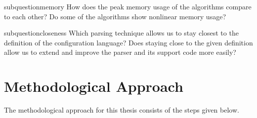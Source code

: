 \begin{restatable}{subquestion}{memory}
  \label{que:memory}
  How does the peak memory usage of the algorithms compare to each other? Do some of the algorithms show nonlinear memory usage?
\end{restatable}

\begin{restatable}{subquestion}{closeness}
  \label{que:closeness}
  Which parsing technique allows us to stay closest to the definition of the configuration language? Does staying close to the given definition
  allow us to extend and improve the parser and its support code more easily?
\end{restatable}

\section{Methodological Approach}

The methodological approach for this thesis consists of the steps given below.

